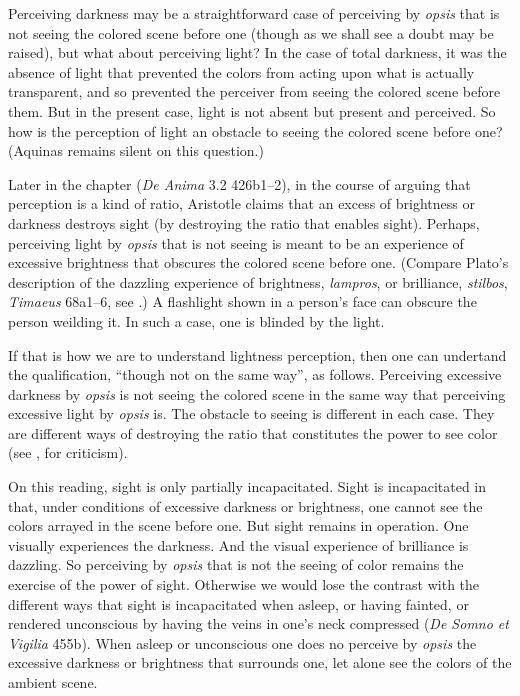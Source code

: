 Perceiving darkness may be a straightforward case of perceiving by \emph{opsis} that is not seeing the colored scene before one (though as we shall see a doubt may be raised), but what about perceiving light? In the case of total darkness, it was the absence of light that prevented the colors from acting upon what is actually transparent, and so prevented the perceiver from seeing the colored scene before them. But in the present case, light is not absent but present and perceived. So how is the perception of light an obstacle to seeing the colored scene before one? (Aquinas remains silent on this question.)

Later in the chapter (\emph{De Anima} 3.2 426b1–2), in the course of arguing that perception is a kind of ratio, Aristotle claims that an excess of brightness or darkness destroys sight (by destroying the ratio that enables sight). Perhaps, perceiving light by \emph{opsis} that is not seeing is meant to be an experience of excessive brightness that obscures the colored scene before one. (Compare Plato's description of the dazzling experience of brightness, \emph{lampros}, or brilliance, \emph{stilbos}, \emph{Timaeus} 68a1–6, see \citealt[72–7]{Kalderon:2022kl}.) A flashlight shown in a person's face can obscure the person weilding it. In such a case, one is blinded by the light.

If that is how we are to understand lightness perception, then one can undertand the qualification, ``though not on the same way'', as follows. Perceiving excessive darkness by \emph{opsis} is not seeing the colored scene in the same way that perceiving excessive light by \emph{opsis} is. The obstacle to seeing is different in each case. They are different ways of destroying the ratio that constitutes the power to see color (see \citealt[275]{Ross:1961uq}, for criticism).

On this reading, sight is only partially incapacitated. Sight is incapacitated in that, under conditions of excessive darkness or brightness, one cannot see the colors arrayed in the scene before one. But sight remains in operation. One visually experiences the darkness. And the visual experience of brilliance is dazzling. So perceiving by \emph{opsis} that is not the seeing of color remains the exercise of the power of sight. Otherwise we would lose the contrast with the different ways that sight is incapacitated when asleep, or having fainted, or rendered unconscious by having the veins in one's neck compressed (\emph{De Somno et Vigilia} 455b). When asleep or unconscious one does no perceive by \emph{opsis} the excessive darkness or brightness that surrounds one, let alone see the colors of the ambient scene.

